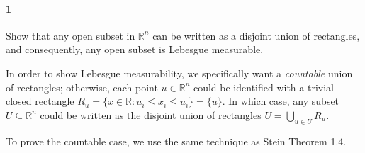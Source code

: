 \documentclass[12pt]{article}
\newenvironment{fullbox}{\begin{lrbox}{\savefullbox}\begin{minipage}{\dimexpr\textwidth-2\fboxsep\relax}}{\end{minipage}\end{lrbox}\begin{center}\framebox[\textwidth]{\usebox{\savefullbox}}\end{center}}
\newenvironment{pbox}[1][]{\begin{fullbox}\ifx#1\empty\else\paragraph{#1}\fi}{\end{fullbox}}
\newcommand{\R}{\mathbb{R}}
\newcommand{\<}{\langle}
\renewcommand{\>}{\rangle}
\begin{document}
\thispagestyle{title}

\begin{pbox}[1]
    Show that any open subset in $\R^n$ can be written as a disjoint union of rectangles, and consequently, any open subset is Lebesgue measurable.
\end{pbox}

In order to show Lebesgue measurability, we specifically want a \textit{countable} union of rectangles; otherwise, each point $u \in \R^n$ could be identified with a trivial closed rectangle $R_u = \{x \in \R : u_i \leq x_i \leq u_i\} = \{u\}$. In which case, any subset $U \subseteq \R^n$ could be written as the disjoint union of rectangles $U = \bigcup_{u \in U} R_u$.

To prove the countable case, we use the same technique as Stein Theorem 1.4.
\end{document}
